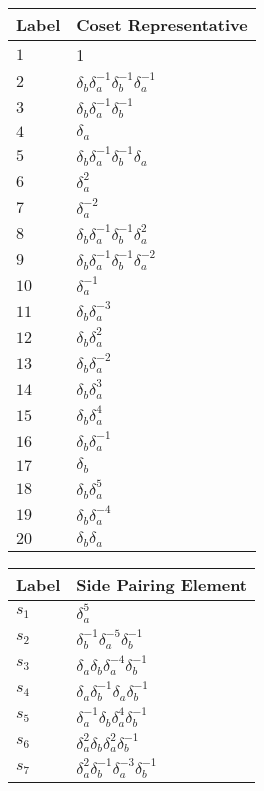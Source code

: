 \documentclass{article}
\begin{document}
\begin{center}
\begin{tabular}{ll}
\toprule
Label & Coset Representative\\
\midrule
$1$ & 1 \\
$2$ & $\delta_b^{}\delta_a^{-1}\delta_b^{-1}\delta_a^{-1}$ \\
$3$ & $\delta_b^{}\delta_a^{-1}\delta_b^{-1}$ \\
$4$ & $\delta_a^{}$ \\
$5$ & $\delta_b^{}\delta_a^{-1}\delta_b^{-1}\delta_a^{}$ \\
$6$ & $\delta_a^{2}$ \\
$7$ & $\delta_a^{-2}$ \\
$8$ & $\delta_b^{}\delta_a^{-1}\delta_b^{-1}\delta_a^{2}$ \\
$9$ & $\delta_b^{}\delta_a^{-1}\delta_b^{-1}\delta_a^{-2}$ \\
$10$ & $\delta_a^{-1}$ \\
$11$ & $\delta_b^{}\delta_a^{-3}$ \\
$12$ & $\delta_b^{}\delta_a^{2}$ \\
$13$ & $\delta_b^{}\delta_a^{-2}$ \\
$14$ & $\delta_b^{}\delta_a^{3}$ \\
$15$ & $\delta_b^{}\delta_a^{4}$ \\
$16$ & $\delta_b^{}\delta_a^{-1}$ \\
$17$ & $\delta_b^{}$ \\
$18$ & $\delta_b^{}\delta_a^{5}$ \\
$19$ & $\delta_b^{}\delta_a^{-4}$ \\
$20$ & $\delta_b^{}\delta_a^{}$ \\
\bottomrule
\end{tabular}
\hfill
\begin{tabular}{ll}
\toprule
Label & Side Pairing Element\\
\midrule
$s_{1}$ & $\delta_a^{5}$ \\
$s_{2}$ & $\delta_b^{-1}\delta_a^{-5}\delta_b^{-1}$ \\
$s_{3}$ & $\delta_a^{}\delta_b^{}\delta_a^{-4}\delta_b^{-1}$ \\
$s_{4}$ & $\delta_a^{}\delta_b^{-1}\delta_a^{}\delta_b^{-1}$ \\
$s_{5}$ & $\delta_a^{-1}\delta_b^{}\delta_a^{4}\delta_b^{-1}$ \\
$s_{6}$ & $\delta_a^{2}\delta_b^{}\delta_a^{2}\delta_b^{-1}$ \\
$s_{7}$ & $\delta_a^{2}\delta_b^{-1}\delta_a^{-3}\delta_b^{-1}$ \\

\end{tabular}
\end{center}
\end{document}
